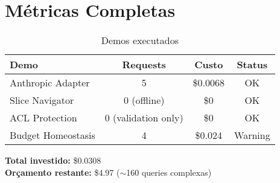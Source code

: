 \documentclass[11pt]{article}
\begin{document}
\section{Métricas Completas}

\begin{table}[H]
\centering
\begin{tabular}{@{}lccc@{}}
\toprule
\textbf{Demo} & \textbf{Requests} & \textbf{Custo} & \textbf{Status} \\ \midrule
Anthropic Adapter & 5 & \$0.0068 & OK \\
Slice Navigator & 0 (offline) & \$0 & OK \\
ACL Protection & 0 (validation only) & \$0 & OK \\
Budget Homeostasis & 4 & \$0.024 & Warning \\ \bottomrule
\end{tabular}
\caption{Demos executados}
\end{table}

\textbf{Total investido:} \$0.0308\\
\textbf{Orçamento restante:} \$4.97 ($\sim$160 queries complexas)
\end{document}
